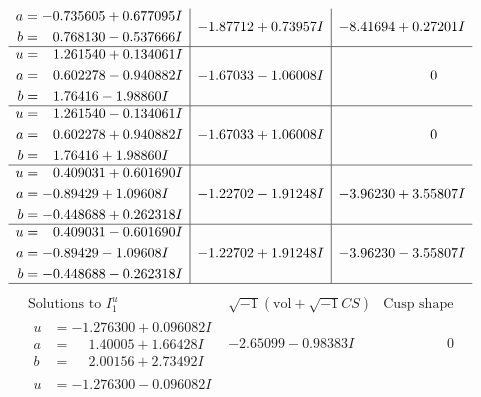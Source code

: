 \documentclass[1p]{elsarticle_modified}
\theoremstyle{definition}
\newcommand{\I}{\sqrt{-1}}
\begin{document}
$$\begin{array}{c|c|c}
\begin{aligned}
a &= -0.735605 + 0.677095 I \\
b &= \phantom{-}0.768130 - 0.537666 I\end{aligned}
 & -1.87712 + 0.73957 I & -8.41694 + 0.27201 I \\ \hline\begin{aligned}
u &= \phantom{-}1.261540 + 0.134061 I \\
a &= \phantom{-}0.602278 - 0.940882 I \\
b &= \phantom{-}1.76416 - 1.98860 I\end{aligned}
 & -1.67033 - 1.06008 I & \phantom{-0.000000 } 0 \\ \hline\begin{aligned}
u &= \phantom{-}1.261540 - 0.134061 I \\
a &= \phantom{-}0.602278 + 0.940882 I \\
b &= \phantom{-}1.76416 + 1.98860 I\end{aligned}
 & -1.67033 + 1.06008 I & \phantom{-0.000000 } 0 \\ \hline\begin{aligned}
u &= \phantom{-}0.409031 + 0.601690 I \\
a &= -0.89429 + 1.09608 I \\
b &= -0.448688 + 0.262318 I\end{aligned}
 & -1.22702 - 1.91248 I & -3.96230 + 3.55807 I \\ \hline\begin{aligned}
u &= \phantom{-}0.409031 - 0.601690 I \\
a &= -0.89429 - 1.09608 I \\
b &= -0.448688 - 0.262318 I\end{aligned}
 & -1.22702 + 1.91248 I & -3.96230 - 3.55807 I\\
 \hline 
 \end{array}$$\newpage$$\begin{array}{c|c|c}  
\text{Solutions to }I^u_{1}& \I (\text{vol} + \sqrt{-1}CS) & \text{Cusp shape}\\
 \hline 
\begin{aligned}
u &= -1.276300 + 0.096082 I \\
a &= \phantom{-}1.40005 + 1.66428 I \\
b &= \phantom{-}2.00156 + 2.73492 I\end{aligned}
 & -2.65099 - 0.98383 I & \phantom{-0.000000 } 0 \\ \hline\begin{aligned}
u &= -1.276300 - 0.096082 I \\

\end{aligned}
\end{array}$$
\end{document}
